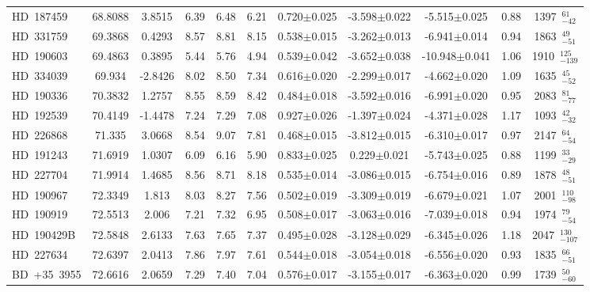 {\begin{longtable}{lcccccccccc}
HD~187459 & 68.8088 & 3.8515 & 6.39 & 6.48 & 6.21 & 0.720$\pm$0.025 & -3.598$\pm$0.022 & -5.515$\pm$0.025 & 0.88 & 1397~$_{-42}^{61}$ \\
\noalign{\smallskip}
HD~331759 & 69.3868 & 0.4293 & 8.57 & 8.81 & 8.15 & 0.538$\pm$0.015 & -3.262$\pm$0.013 & -6.941$\pm$0.014 & 0.94 & 1863~$_{-51}^{49}$ \\
\noalign{\smallskip}
HD~190603 & 69.4863 & 0.3895 & 5.44 & 5.76 & 4.94 & 0.539$\pm$0.042 & -3.652$\pm$0.038 & -10.948$\pm$0.041 & 1.06 & 1910~$_{-139}^{125}$ \\
\noalign{\smallskip}
HD~334039 & 69.934 & -2.8426 & 8.02 & 8.50 & 7.34 & 0.616$\pm$0.020 & -2.299$\pm$0.017 & -4.662$\pm$0.020 & 1.09 & 1635~$_{-52}^{45}$ \\
\noalign{\smallskip}
HD~190336 & 70.3832 & 1.2757 & 8.55 & 8.59 & 8.42 & 0.484$\pm$0.018 & -3.592$\pm$0.016 & -6.991$\pm$0.020 & 0.95 & 2083~$_{-77}^{81}$ \\
\noalign{\smallskip}
HD~192539 & 70.4149 & -1.4478 & 7.24 & 7.29 & 7.08 & 0.927$\pm$0.026 & -1.397$\pm$0.024 & -4.371$\pm$0.028 & 1.17 & 1093~$_{-32}^{42}$ \\
\noalign{\smallskip}
HD~226868 & 71.335 & 3.0668 & 8.54 & 9.07 & 7.81 & 0.468$\pm$0.015 & -3.812$\pm$0.015 & -6.310$\pm$0.017 & 0.97 & 2147~$_{-54}^{64}$ \\
\noalign{\smallskip}
HD~191243 & 71.6919 & 1.0307 & 6.09 & 6.16 & 5.90 & 0.833$\pm$0.025 & 0.229$\pm$0.021 & -5.743$\pm$0.025 & 0.88 & 1199~$_{-29}^{33}$ \\
\noalign{\smallskip}
HD~227704 & 71.9914 & 1.4685 & 8.56 & 8.71 & 8.18 & 0.535$\pm$0.014 & -3.086$\pm$0.015 & -6.754$\pm$0.016 & 0.89 & 1878~$_{-51}^{48}$ \\
\noalign{\smallskip}
HD~190967 & 72.3349 & 1.813 & 8.03 & 8.27 & 7.56 & 0.502$\pm$0.019 & -3.309$\pm$0.019 & -6.679$\pm$0.021 & 1.07 & 2001~$_{-98}^{110}$ \\
\noalign{\smallskip}
HD~190919 & 72.5513 & 2.006 & 7.21 & 7.32 & 6.95 & 0.508$\pm$0.017 & -3.063$\pm$0.016 & -7.039$\pm$0.018 & 0.94 & 1974~$_{-54}^{79}$ \\
\noalign{\smallskip}
HD~190429B & 72.5848 & 2.6133 & 7.63 & 7.65 & 7.37 & 0.495$\pm$0.028 & -3.128$\pm$0.029 & -6.345$\pm$0.026 & 1.18 & 2047~$_{-107}^{130}$ \\
\noalign{\smallskip}
HD~227634 & 72.6397 & 2.0413 & 7.86 & 7.97 & 7.61 & 0.544$\pm$0.018 & -3.054$\pm$0.018 & -6.556$\pm$0.020 & 0.93 & 1835~$_{-51}^{66}$ \\
\noalign{\smallskip}
BD~+35~3955 & 72.6616 & 2.0659 & 7.29 & 7.40 & 7.04 & 0.576$\pm$0.017 & -3.155$\pm$0.017 & -6.363$\pm$0.020 & 0.99 & 1739~$_{-60}^{50}$ \\

\end{longtable}}
